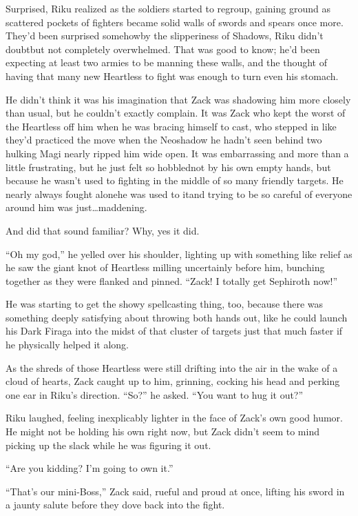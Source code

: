 Surprised, Riku realized as the soldiers started to regroup, gaining ground as scattered pockets of fighters became solid walls of swords and spears once more. They'd been surprised somehow\textemdash by the slipperiness of Shadows, Riku didn't doubt\textemdash but not completely overwhelmed. That was good to know; he'd been expecting at least two armies to be manning these walls, and the thought of having that many new Heartless to fight was enough to turn even his stomach.

He didn't think it was his imagination that Zack was shadowing him more closely than usual, but he couldn't exactly complain. It was Zack who kept the worst of the Heartless off him when he was bracing himself to cast, who stepped in like they'd practiced the move when the Neoshadow he hadn't seen behind two hulking Magi nearly ripped him wide open. It was embarrassing and more than a little frustrating, but he just felt so hobbled\textemdash not by his own empty hands, but because he wasn't used to fighting in the middle of so many friendly targets. He nearly always fought alone\textemdash he was used to it\textemdash and trying to be so careful of everyone around him was just\ldots maddening.

And did that sound familiar? Why, yes it did.

``Oh my god,'' he yelled over his shoulder, lighting up with something like relief as he saw the giant knot of Heartless milling uncertainly before him, bunching together as they were flanked and pinned. ``Zack! I totally get Sephiroth now!''

He was starting to get the showy spellcasting thing, too, because there was something deeply satisfying about throwing both hands out, like he could launch his Dark Firaga into the midst of that cluster of targets just that much faster if he physically helped it along.

As the shreds of those Heartless were still drifting into the air in the wake of a cloud of hearts, Zack caught up to him, grinning, cocking his head and perking one ear in Riku's direction. ``So?'' he asked. ``You want to hug it out?''

Riku laughed, feeling inexplicably lighter in the face of Zack's own good humor. He might not be holding his own right now, but Zack didn't seem to mind picking up the slack while he was figuring it out.

``Are you kidding? I'm going to own it.''

``That's our mini-Boss,'' Zack said, rueful and proud at once, lifting his sword in a jaunty salute before they dove back into the fight.

